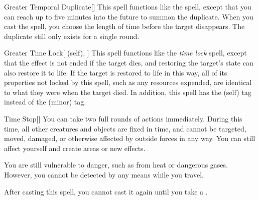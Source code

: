 \lowercase{\hypertarget{spell:Greater Temporal Duplicate}{}}\label{spell:Greater Temporal Duplicate}
\begin{apability}[\nth{7}]{\hypertarget{spell:Greater Temporal Duplicate}{Greater Temporal Duplicate}}[]
This spell functions like the  spell, except that you can reach up to five minutes into the future to summon the duplicate.
When you cast the spell, you choose the length of time before the target disappears.
The duplicate still only exists for a single round.
\end{apability}
\vspace{0.25em}



\lowercase{\hypertarget{spell:Greater Time Lock}{}}\label{spell:Greater Time Lock}
\begin{attuneability}[\nth{7}]{\hypertarget{spell:Greater Time Lock}{Greater Time Lock}}[ (self), ]
This spell functions like the \textit{time lock} spell, except that the effect is not ended if the target dies, and restoring the target's state can also restore it to life.
If the target is restored to life in this way, all of its properties not locked by this spell, such as any resources expended, are identical to what they were when the target died.
In addition, this spell has the  (self) tag instead of the  (minor) tag.
\end{attuneability}
\vspace{0.25em}



\lowercase{\hypertarget{spell:Time Stop}{}}\label{spell:Time Stop}
\begin{apability}[\nth{7}]{\hypertarget{spell:Time Stop}{Time Stop}}[]
You can take two full rounds of actions immediately.
During this time, all other creatures and objects are fixed in time, and cannot be targeted, moved, damaged, or otherwise affected by outside forces in any way.
You can still affect yourself and create areas or new effects.

You are still vulnerable to danger, such as from heat or dangerous gases.
However, you cannot be detected by any means while you travel.

After casting this spell, you cannot cast it again until you take a .
\end{apability}
\vspace{0.25em}



